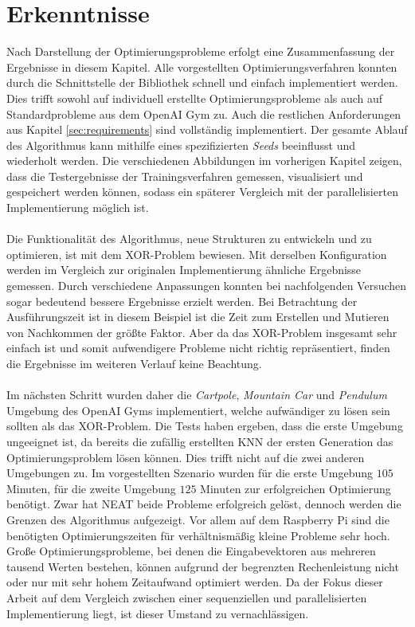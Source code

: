 \section{Erkenntnisse}
\label{sec:analysis_results}
Nach Darstellung der Optimierungsprobleme erfolgt eine Zusammenfassung der Ergebnisse in diesem Kapitel. Alle vorgestellten Optimierungsverfahren konnten durch die Schnittstelle der Bibliothek schnell und einfach implementiert werden. Dies trifft sowohl auf individuell erstellte Optimierungsprobleme als auch auf Standardprobleme aus dem OpenAI Gym zu. Auch die restlichen Anforderungen aus Kapitel \ref{sec:requirements} sind vollständig implementiert. Der gesamte Ablauf des Algorithmus kann mithilfe eines spezifizierten \emph{Seeds} beeinflusst und wiederholt werden. Die verschiedenen Abbildungen im vorherigen Kapitel zeigen, dass die Testergebnisse der Trainingsverfahren gemessen, visualisiert und gespeichert werden können, sodass ein späterer Vergleich mit der parallelisierten Implementierung möglich ist.
\\\\
Die Funktionalität des Algorithmus, neue Strukturen zu entwickeln und zu optimieren, ist mit dem XOR-Problem bewiesen. Mit derselben Konfiguration werden im Vergleich zur originalen Implementierung ähnliche Ergebnisse gemessen. Durch verschiedene Anpassungen konnten bei nachfolgenden Versuchen sogar bedeutend bessere Ergebnisse erzielt werden. Bei Betrachtung der Ausführungszeit ist in diesem Beispiel ist die Zeit zum Erstellen und Mutieren von Nachkommen der größte Faktor. Aber da das XOR-Problem insgesamt sehr einfach ist und somit aufwendigere Probleme nicht richtig repräsentiert, finden die Ergebnisse im weiteren Verlauf keine Beachtung.
\\\\
Im nächsten Schritt wurden daher die \emph{Cartpole}, \emph{Mountain Car} und \emph{Pendulum} Umgebung des OpenAI Gyms implementiert, welche aufwändiger zu lösen sein sollten als das XOR-Problem. Die Tests haben ergeben, dass die erste Umgebung ungeeignet ist, da bereits die zufällig erstellten \ac{KNN} der ersten Generation das Optimierungsproblem lösen können. Dies trifft nicht auf die zwei anderen Umgebungen zu. Im vorgestellten Szenario wurden für die erste Umgebung $105$ Minuten, für die zweite Umgebung $125$ Minuten zur erfolgreichen Optimierung benötigt. Zwar hat \ac{NEAT} beide Probleme erfolgreich gelöst, dennoch werden die Grenzen des Algorithmus aufgezeigt. Vor allem auf dem Raspberry Pi sind die benötigten Optimierungszeiten für verhältnismäßig kleine Probleme sehr hoch. Große Optimierungsprobleme, bei denen die Eingabevektoren aus mehreren tausend Werten bestehen, können aufgrund der begrenzten Rechenleistung nicht oder nur mit sehr hohem Zeitaufwand optimiert werden. Da der Fokus dieser Arbeit auf dem Vergleich zwischen einer sequenziellen und parallelisierten Implementierung liegt, ist dieser Umstand zu vernachlässigen.
